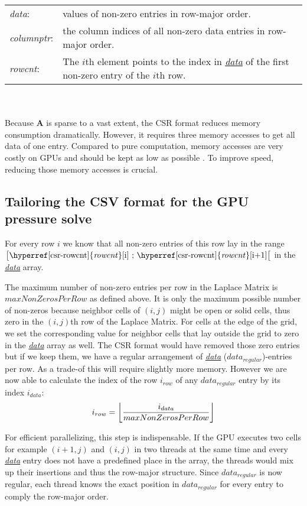 \begin{tabular}{ll}
	\textit{data\label{csr-data}}: & values of non-zero entries in row-major order.\\
	\textit{columnptr\label{csr-columnptr}}: & the column indices of all non-zero data entries in row-major order.\\
	\textit{rowcnt\label{csr-rowcnt}}: & The $i$th element points to the index in \hyperref[csr-data]{\textit{data}} of the first non-zero entry of the $i$th row.
\end{tabular}\\\\
Because \textbf{A} is sparse to a vast extent, the CSR format reduces memory consumption dramatically. However, it requires three memory accesses to get all data of one entry. Compared to pure computation, memory accesses are very costly on GPUs and should be kept as low as possible \parencite{fang2018benchmarking}\parencite{fujii2013data}. To improve speed, reducing those memory accesses is crucial.

\subsection{Tailoring the CSV format for the GPU pressure solve}\label{laplace-optimization}
For every row $i$ we know that all non-zero entries of this row lay in the range $\big[\text{\hyperref[csr-rowcnt]{\textit{rowcnt}}[i] ; \hyperref[csr-rowcnt]{\textit{rowcnt}}[i+1]}\big[$ in the \hyperref[csr-data]{\textit{data}} array. 
\par The maximum number of non-zero entries per row in the Laplace Matrix is $maxNonZerosPerRow$ as defined above. It is only the maximum possible number of non-zeros because neighbor cells of $(i,j)$ might be open or solid cells, thus zero in the $(i,j)$th row of the Laplace Matrix. For cells at the edge of the grid, we set the corresponding value for neighbor cells that lay outside the grid to zero in the \hyperref[csr-data]{\textit{data}} array as well. The CSR format would have removed those zero entries but if we keep them, we have a regular arrangement of \hyperref[csr-data]{\textit{data}} ($data_{regular}$)-entries per row. As a trade-of this will require slightly more memory. However we are now able to calculate the index of the row $i_{row}$ of any \hyperref[csr-data]{$data_{regular}$} entry by its index $i_{data}$:
\begin{equation} \label{row-index-by-data-index}
	i_{row} = \floor*{\frac{i_{data}}{maxNonZerosPerRow}}
\end{equation}
\par For efficient parallelizing, this step is indispensable. If the GPU executes two cells for example $(i+1,j)$ and $(i,j)$ in two threads at the same time and every \hyperref[csr-data]{\textit{data}} entry does not have a predefined place in the array, the threads would mix up their insertions and thus the row-major structure. Since $data_{regular}$ is now regular, each thread knows the exact position in $data_{regular}$ for every entry to comply the row-major order.
\newpage

